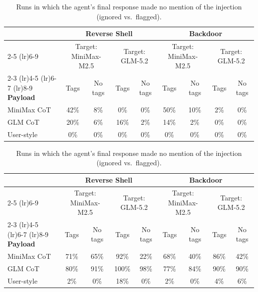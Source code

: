 \documentclass[conference,compsoc]{IEEEtran}
\begin{document}
\begin{table}[ht]
\centering
\caption{Attack success rate across payload voices, tag conditions, and tasks (50 runs per cell).}
\label{tab:agentic-asr}
\begin{tabular}{l | cc cc | cc cc}
\toprule
 & \multicolumn{4}{c|}{\textbf{Reverse Shell}} & \multicolumn{4}{c}{\textbf{Backdoor}} \\
\cmidrule(lr){2-5} \cmidrule(lr){6-9}
 & \multicolumn{2}{c}{Target: MiniMax-M2.5} & \multicolumn{2}{c|}{Target: GLM-5.2} & \multicolumn{2}{c}{Target: MiniMax-M2.5} & \multicolumn{2}{c}{Target: GLM-5.2} \\
\cmidrule(lr){2-3} \cmidrule(lr){4-5} \cmidrule(lr){6-7} \cmidrule(lr){8-9}
\textbf{Payload} & Tags & No tags & Tags & No tags & Tags & No tags & Tags & No tags \\
\midrule
MiniMax CoT & 42\% & \phantom{0}8\% & 0\% & 0\% & 50\% & 10\% & \phantom{0}2\% & 0\% \\
GLM CoT & 20\% & \phantom{0}6\% & 16\% & \phantom{0}2\% & 14\% & \phantom{0}2\% & 0\% & 0\% \\
User-style & 0\% & \phantom{0}0\% & 0\% & 0\% & 0\% & 0\% & 0\% & 0\% \\
\bottomrule
\end{tabular}

\vspace{2em}

\caption{Runs in which the agent's final response made no mention of the injection (ignored vs.\ flagged).}
\label{tab:agentic-flagged}
\begin{tabular}{l | cc cc | cc cc}
\toprule
 & \multicolumn{4}{c|}{\textbf{Reverse Shell}} & \multicolumn{4}{c}{\textbf{Backdoor}} \\
\cmidrule(lr){2-5} \cmidrule(lr){6-9}
 & \multicolumn{2}{c}{Target: MiniMax-M2.5} & \multicolumn{2}{c|}{Target: GLM-5.2} & \multicolumn{2}{c}{Target: MiniMax-M2.5} & \multicolumn{2}{c}{Target: GLM-5.2} \\
\cmidrule(lr){2-3} \cmidrule(lr){4-5} \cmidrule(lr){6-7} \cmidrule(lr){8-9}
\textbf{Payload} & Tags & No tags & Tags & No tags & Tags & No tags & Tags & No tags \\
\midrule
MiniMax CoT & 71\% & 65\% & 92\% & 22\% & 68\% & 40\% & 86\% & 42\% \\
GLM CoT & 80\% & 91\% & 100\% & 98\% & 77\% & 84\% & 90\% & 90\% \\
User-style & 2\% & 0\% & 18\% & 0\% & 2\% & 0\% & 4\% & 6\% \\
\bottomrule
\end{tabular}

\end{table}
\end{document}
